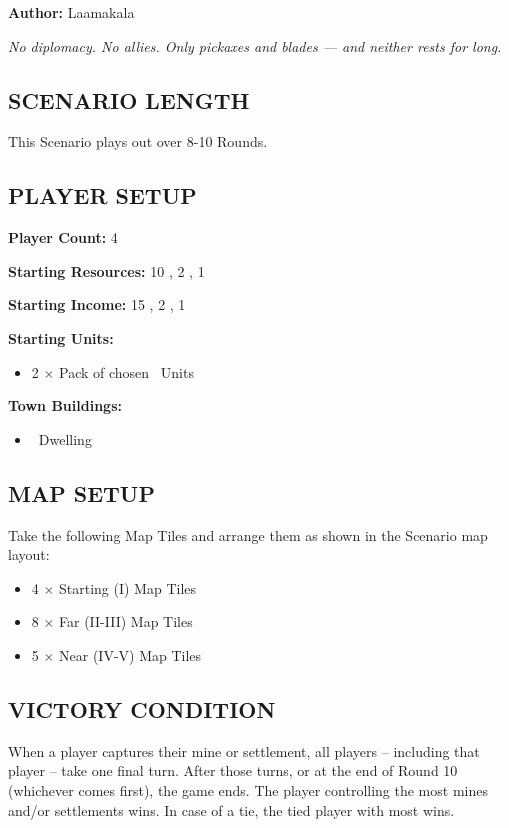 
\begin{multicols*}{2}

\textbf{Author:} Laamakala

\textit{No diplomacy. No allies. Only pickaxes and blades — and neither rests for long.}

\subsection*{\MakeUppercase{Scenario Length}}
This Scenario plays out over 8-10 Rounds.

\subsection*{\MakeUppercase{Player Setup}}
\textbf{Player Count:} 4

\textbf{Starting Resources:} 10 , 2 , 1 

\textbf{Starting Income:} 15 , 2 , 1 

\textbf{Starting Units:}
\begin{itemize}
  \item 2 × Pack of chosen \bronze\ Units
\end{itemize}

\textbf{Town Buildings:}
\begin{itemize}
  \item \bronze\ Dwelling
\end{itemize}

\subsection*{\MakeUppercase{Map Setup}}
Take the following Map Tiles and arrange them as shown in the Scenario map layout:

\begin{itemize}
  \item 4 × Starting (I) Map Tiles
  \item 8 × Far (II-III) Map Tiles
  \item 5 × Near (IV-V) Map Tiles
\end{itemize}

\subsection*{\MakeUppercase{Victory Condition}}
When a player captures their  mine or settlement, all players -- including that player -- take one final turn. After those turns, or at the end of Round 10 (whichever comes first), the game ends. The player controlling the most mines and/or settlements wins. In case of a tie, the tied player with most  wins.


\end{multicols*}

